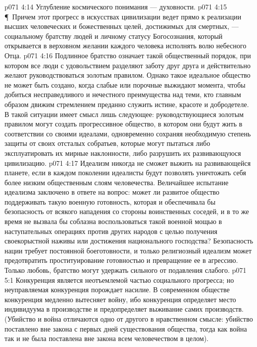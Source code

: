 \vs p071 4:14 \bibnobreakspace Углубление космического понимания --- духовности.
\vs p071 4:15 \P\ Причем этот прогресс в искусствах цивилизации ведет прямо к реализации высших человеческих и божественных целей, достижимых для смертных, --- социальному братству людей и личному статусу Богосознания, который открывается в верховном желании каждого человека исполнять волю небесного Отца.
\vs p071 4:16 Подлинное братство означает такой общественный порядок, при котором все люди с удовольствием разделяют заботу друг друга и действительно желают руководствоваться золотым правилом. Однако такое идеальное общество не может быть создано, когда слабые или порочные выжидают момента, чтобы добиться несправедливого и нечестного преимущества над теми, кто главным образом движим стремлением преданно служить истине, красоте и добродетеле. В такой ситуации имеет смысл лишь следующее: руководствующиеся золотым правилом могут создать прогрессивное общество, в котором они будут жить в соответствии со своими идеалами, одновременно сохраняя необходимую степень защиты от своих отсталых собратьев, которые могут пытаться либо эксплуатировать их мирные наклонности, либо разрушить их развивающуюся цивилизацию.
\vs p071 4:17 Идеализм никогда не сможет выжить на развивающейся планете, если в каждом поколении идеалисты будут позволять уничтожать себя более низким общественным слоям человечества. Величайшее испытание идеализма заключено в ответе на вопрос: может ли развитое общество поддерживать такую военную готовность, которая и обеспечивала бы безопасность от всякого нападения со стороны воинственных соседей, и в то же время не вызвала бы соблазна воспользоваться такой военной мощью в наступательных операциях против других народов с целью получения своекорыстной наживы или достижения национального господства? Безопасность нации требует постоянной боеготовности, и только религиозный идеализм может предотвратить проституирование готовностью и превращение ее в агрессию. Только любовь, братство могут удержать сильного от подавления слабого.
\vs p071 5:1 Конкуренция является неотъемлемой частью социального прогресса; но неуправляемая конкуренция порождает насилие. В современном обществе конкуренция медленно вытесняет войну, ибо конкуренция определяет место индивидуума в производстве и предопределяет выживание самих производств. (Убийство и война отличаются одно от другого в нравственном смысле: убийство поставлено вне закона с первых дней существования общества, тогда как война так и не была поставлена вне закона всем человечеством в целом).
